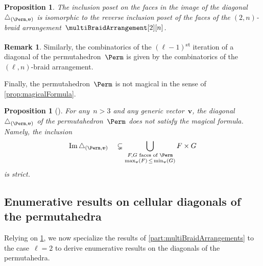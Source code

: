 \documentclass{amsart}
\newtheorem{proposition}[theorem]{Proposition}
\theoremstyle{definition}
\newtheorem{remark}[theorem]{Remark}
\renewcommand{\b}[1]{{\boldsymbol{#1}}} %
\DeclareMathOperator{\Ima}{Im} %
\newcommand{\ordinalst}{\textsuperscript{st}} %
\renewcommand{\b}[1]{\boldsymbol{#1}} %
\begin{document}
\begin{proposition}
\label{prop:diagonalPermutahedraMultiBraidArrangements}
The inclusion poset on the faces in the image of the diagonal~$\triangle_{(\Perm, \b{v})}$ is isomorphic to the reverse inclusion poset of the faces of the $(2,n)$-braid arrangement~$\multiBraidArrangement[2][n]$. 
\end{proposition}

\begin{remark}
Similarly, the combinatorics of the $(\ell-1)$\ordinalst{} iteration of a diagonal of the permutahedron~$\Perm$ is given by the combinatorics of the $(\ell,n)$-braid arrangement.
\end{remark}

Finally, the permutahedron~$\Perm$ is not magical in the sense of \cref{prop:magicalFormula}.

\begin{proposition}[{\cite[Sect.~3]{LA21}}]
For any~$n > 3$ and any generic vector~$\b{v}$, the diagonal~$\triangle_{(\Perm, \b{v})}$ of the permutahedron~$\Perm$ does \emph{not} satisfy the magical formula.
Namely, the inclusion      
\begin{equation*}
\Ima\triangle_{(\Perm, \b{v})} \quad \subsetneq \bigcup_{\substack{F,G \text{ faces of } \Perm \\ \max_{\b{v}}(F) \, \le \, \min_{\b{v}}(G)}} F \times G  
\end{equation*}
is strict.
\end{proposition}


\subsection{Enumerative results on cellular diagonals of the permutahedra} 
\label{subsec:enumerationDiagonalPermutahedra}

Relying on \cref{prop:diagonalPermutahedraMultiBraidArrangements}, we now specialize the results of \cref{part:multiBraidArrangements} to the case~$\ell = 2$ to derive enumerative results on the diagonals of the permutahedra.
\end{document}

